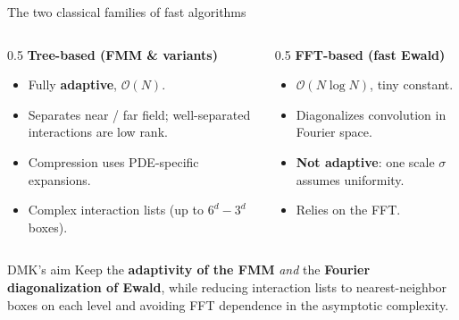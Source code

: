 \documentclass[aspectratio=169,11pt]{beamer}
\newcommand{\cO}{\mathcal{O}}
\newcommand{\hl}[1]{{\color{CCMorange}\textbf{#1}}}
\begin{document}
\begin{frame}{The two classical families of fast algorithms}
\small
\begin{columns}[T,totalwidth=\textwidth]
\begin{column}{0.5\textwidth}
\textbf{Tree-based (FMM \& variants)}
\begin{itemize}\itemsep2pt
  \item Fully \hl{adaptive}, \(\cO(N)\).
  \item Separates near / far field; well-separated interactions are low rank.
  \item Compression uses PDE-specific expansions.
  \item Complex interaction lists (up to \(6^d-3^d\) boxes).
\end{itemize}
\end{column}
\begin{column}{0.5\textwidth}
\textbf{FFT-based (fast Ewald)}
\begin{itemize}\itemsep2pt
  \item \(\cO(N\log N)\), tiny constant.
  \item Diagonalizes convolution in Fourier space.
  \item \hl{Not adaptive}: one scale \(\sigma\) assumes uniformity.
  \item Relies on the FFT.
\end{itemize}
\end{column}
\end{columns}
\vspace{3mm}
\begin{block}{DMK's aim}
Keep the \hl{adaptivity of the FMM} \emph{and} the \hl{Fourier diagonalization
of Ewald}, while reducing interaction lists to nearest-neighbor boxes on each
level and avoiding FFT dependence in the asymptotic complexity.
\end{block}
\end{frame}
\end{document}
